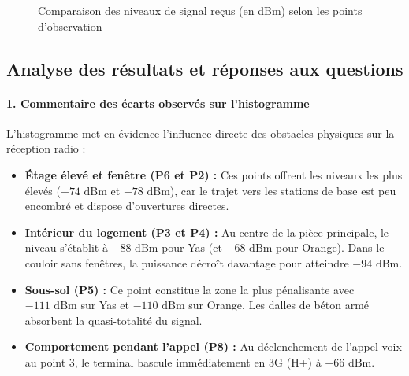 \documentclass[11pt,a4paper]{article}
\begin{document}
\begin{figure}[H]
\centering
{}
\caption{Comparaison des niveaux de signal re\c{c}us (en dBm) selon les points d'observation}
\label{fig:histogramme_b}
\end{figure}

\subsection{Analyse des r\'esultats et r\'eponses aux questions}

\paragraph{1. Commentaire des \'ecarts observ\'es sur l'histogramme}
L'histogramme met en \'evidence l'influence directe des obstacles physiques sur la r\'eception radio :
\begin{itemize}
    \item \textbf{\'Etage \'elev\'e et fen\^etre (P6 et P2) :} Ces points offrent les niveaux les plus \'elev\'es ($-74\text{ dBm}$ et $-78\text{ dBm}$), car le trajet vers les stations de base est peu encombr\'e et dispose d'ouvertures directes.
    \item \textbf{Int\'erieur du logement (P3 et P4) :} Au centre de la pi\`ece principale, le niveau s'\'etablit \`a $-88\text{ dBm}$ pour Yas (et $-68\text{ dBm}$ pour Orange). Dans le couloir sans fen\^etres, la puissance d\'ecro\^it davantage pour atteindre $-94\text{ dBm}$.
    \item \textbf{Sous-sol (P5) :} Ce point constitue la zone la plus p\'enalisante avec $-111\text{ dBm}$ sur Yas et $-110\text{ dBm}$ sur Orange. Les dalles de b\'eton arm\'e absorbent la quasi-totalit\'e du signal.
    \item \textbf{Comportement pendant l'appel (P8) :} Au d\'eclenchement de l'appel voix au point 3, le terminal bascule imm\'ediatement en 3G (H+) \`a $-66\text{ dBm}$.
\end{itemize}
\end{document}
